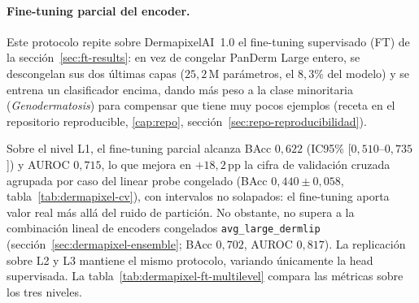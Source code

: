 \paragraph{Fine-tuning parcial del encoder.}
\label{sec:dermapixel-ft}
\label{sec:dermapixel-ft-l1}
Este protocolo repite sobre DermapixelAI~1.0 el fine-tuning supervisado
(FT) de la sección~\ref{sec:ft-results}: en vez de congelar PanDerm
Large entero, se descongelan sus dos últimas capas ($25{,}2$\,M
parámetros, el $8{,}3\%$ del modelo) y se entrena un clasificador
encima, dando más peso a la clase minoritaria (\emph{Genodermatosis})
para compensar que tiene muy pocos ejemplos (receta en el repositorio
reproducible, \ref{cap:repo}, sección~\ref{sec:repo-reproducibilidad}).

Sobre el nivel L1, el fine-tuning parcial alcanza BAcc $0{,}622$
(IC95\% [$0{,}510$--$0{,}735$]) y AUROC $0{,}715$, lo que mejora en
$+18{,}2$\,pp la cifra de validación cruzada agrupada por caso del
linear probe congelado (BAcc $0{,}440 \pm 0{,}058$,
tabla~\ref{tab:dermapixel-cv}), con intervalos no solapados: el
fine-tuning aporta valor real más allá del ruido de partición. No
obstante, no supera a la combinación lineal de encoders
congelados \texttt{avg\_large\_dermlip}
(sección~\ref{sec:dermapixel-ensemble}; BAcc $0{,}702$, AUROC
$0{,}817$). La replicación sobre L2 y L3 mantiene el mismo
protocolo, variando únicamente la head supervisada. La
tabla~\ref{tab:dermapixel-ft-multilevel} compara las métricas
sobre los tres niveles.

